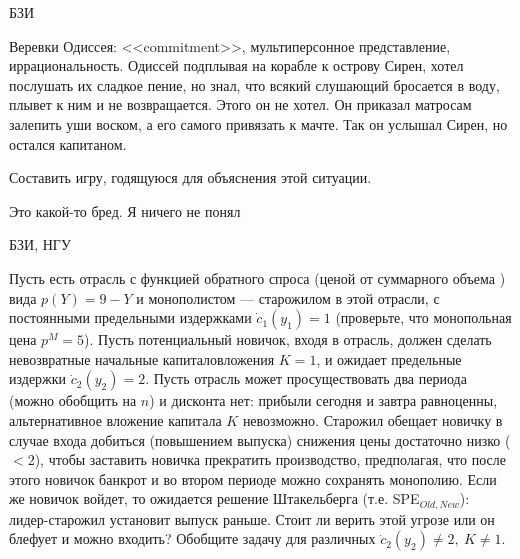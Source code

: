 \begin{problem}
\begin{source}
БЗИ
\end{source}
 {\rm Веревки Одиссея: <<commitment>>, мультиперсонное
представление, иррациональность.} Одиссей подплывая на
корабле к острову Сирен, хотел послушать их сладкое пение,
но знал, что всякий слушающий бросается в воду, плывет к
ним и не возвращается. Этого он не хотел. Он приказал
матросам залепить уши воском, а его самого привязать к
мачте. Так он услышал Сирен, но остался капитаном.

Составить игру, годящуюся для объяснения этой ситуации.


{\red Это какой-то бред. Я ничего не понял}

\begin{sol}

\end{sol}
\end{problem}




\begin{problem}
\begin{source}
БЗИ, НГУ
\end{source} Пусть есть отрасль с
функцией обратного спроса (ценой от суммарного объема ) вида
$p(Y)=9-Y$ и монополистом --- старожилом в этой отрасли, с
постоянными предельными издержками $\dot{c}_1(y_1)=1$
(проверьте, что монопольная цена $p^M=5$). Пусть
потенциальный новичок, входя в отрасль, должен сделать
невозвратные начальные капиталовложения $K=1$, и ожидает
предельные издержки $\dot{c}_2(y_2)=2$. Пусть отрасль может
просуществовать два периода (можно обобщить на $n$) и
дисконта нет: прибыли сегодня и завтра равноценны,
альтернативное вложение капитала $K$ невозможно. Старожил
обещает новичку в случае входа добиться (повышением
выпуска) снижения цены достаточно низко ($<2$), чтобы
заставить новичка прекратить производство, предполагая, что
после этого новичок банкрот и во втором периоде можно
сохранять монополию. Если же новичок войдет, то ожидается
решение Штакельберга (т.е. SPE$_{Old,New}$): лидер-старожил 
установит выпуск раньше. Стоит ли верить этой
угрозе или он блефует и можно входить? Обобщите задачу для
различных $\dot{c}_2(y_2)\neq 2, ~K\neq 1$.






\begin{sol}

\end{sol}
\end{problem}




